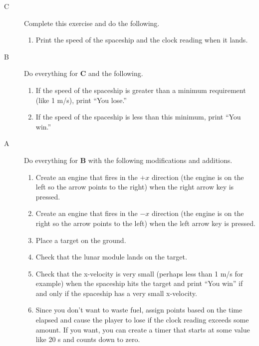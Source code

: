 \begin{description}

\item[C] Complete this exercise and do the following.

\begin{enumerate}
	\item Print the speed of the spaceship and the clock reading when it lands.
\end{enumerate}


\item[B] Do everything for {\bf C} and the following.

\begin{enumerate}
	\item If the speed of the spaceship is greater than a minimum requirement (like 1 m/s), print ``You lose.''
	\item If the speed of the spaceship is less than this minimum, print ``You win.''
\end{enumerate}

\item[A] Do everything for {\bf B} with the following modifications and additions.

\begin{enumerate}
	\item Create an engine that fires in the $+x$ direction (the engine is on the left so the arrow points to the right) when the right arrow key is pressed.
	\item Create an engine that fires in the $-x$ direction (the engine is on the right so the arrow points to the left) when the left arrow key is pressed.
	\item Place a target on the ground.
	\item Check that the lunar module lands on the target.
	\item Check that the x-velocity is very small (perhaps less than 1 m/s for example) when the spaceship hits the target and print ``You win'' if and only if the spaceship has a very small x-velocity.
	\item Since you don't want to waste fuel, assign points based on the time elapsed and cause the player to lose if the clock reading exceeds some amount. If you want, you can create a timer that starts at some value like 20 s and counts down to zero.
\end{enumerate}




\end{description}

